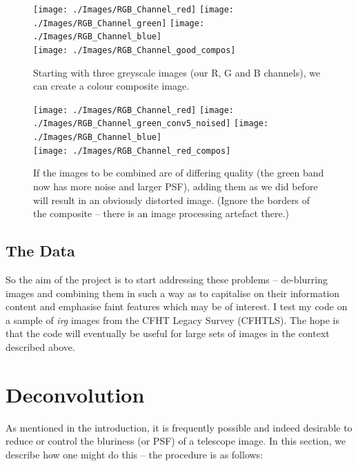 \documentclass[letterpaper, 11pt]{article}
\begin{document}
\begin{figure}
	\centering
	\texttt{[image: ./Images/RGB\_Channel\_red]}
	\texttt{[image: ./Images/RGB\_Channel\_green]}
	\texttt{[image: ./Images/RGB\_Channel\_blue]}\\
	\texttt{[image: ./Images/RGB\_Channel\_good\_compos]}
	\caption{Starting with three greyscale images (our R, G and B channels), we can create a colour composite image.}
	\label{fig:coadd}
	\vspace{1cm}
	\texttt{[image: ./Images/RGB\_Channel\_red]}
	\texttt{[image: ./Images/RGB\_Channel\_green\_conv5\_noised]}
	\texttt{[image: ./Images/RGB\_Channel\_blue]}\\
	\texttt{[image: ./Images/RGB\_Channel\_red\_compos]}
	\caption{If the images to be combined are of differing quality (the green band now has more noise and larger PSF), adding them as we did before will result in an obviously distorted image. (Ignore the borders of the composite -- there is an image processing artefact there.)}
	\label{fig:coadd_fuzz}
\end{figure}


\subsection{The Data}

So the aim of the project is to start addressing these problems -- de-blurring images and combining them in such a way as to capitalise on their information content and emphasise faint features which may be of interest. I test my code on a sample of {\it irg} images from the CFHT Legacy Survey (CFHTLS). The hope is that the code will eventually be useful for large sets of images in the context described above.


\newpage
\section{Deconvolution}
\label{sec:deconvolution}

As mentioned in the introduction, it is frequently possible and indeed desirable to reduce or control the bluriness (or PSF) of a telescope image. In this section, we describe how one might do this -- the procedure is as follows:
\end{document}
